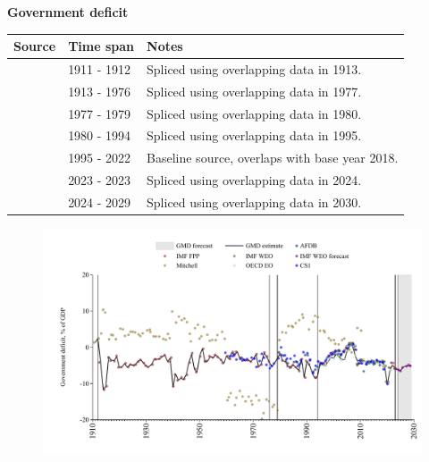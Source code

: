 \documentclass[12pt,a4paper,landscape]{article}
\begin{document}
\begin{adjustbox}{max totalsize={\paperwidth}{\paperheight},center}
\begin{minipage}[t][\textheight][t]{\textwidth}
\vspace*{0.5cm}
{}
\begin{center}
{\Large\bfseries Government deficit}
\end{center}
\vspace{0.5cm}
\begin{table}[H]
\centering
\small
\begin{tabular}{|l|l|l|}
\hline
\textbf{Source} & \textbf{Time span} & \textbf{Notes} \\
\hline
\rowcolor{white}\cite{Mitchell}& 1911 - 1912 &Spliced using overlapping data in 1913. \\
\rowcolor{lightgray}\cite{IMF_FPP}& 1913 - 1976 &Spliced using overlapping data in 1977. \\
\rowcolor{white}\cite{CS1_ZAF}& 1977 - 1979 &Spliced using overlapping data in 1980. \\
\rowcolor{lightgray}\cite{IMF_FPP}& 1980 - 1994 &Spliced using overlapping data in 1995. \\
\rowcolor{white}\cite{OECD_EO}& 1995 - 2022 &Baseline source, overlaps with base year 2018. \\
\rowcolor{lightgray}\cite{IMF_FPP}& 2023 - 2023 &Spliced using overlapping data in 2024. \\
\rowcolor{white}\cite{IMF_WEO_forecast}& 2024 - 2029 &Spliced using overlapping data in 2030. \\
\hline
\end{tabular}
\end{table}
\begin{figure}[H]
\centering
\includegraphics[width=\textwidth,height=0.6\textheight,keepaspectratio]{graphs/ZAF_govdef_GDP.pdf}
\end{figure}
\end{minipage}
\end{adjustbox}
\end{document}
